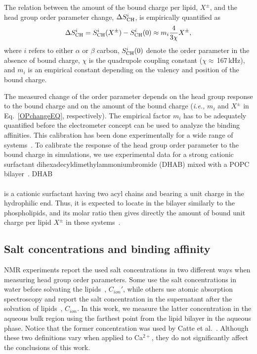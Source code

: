 \documentclass[aip,jcp,twocolumn]{revtex4}
\begin{document}
The relation between the amount of the bound charge per lipid, $X^\pm$, and the head group order parameter change, $\Delta S_{\rm{CH}}^{i}$, is empirically quantified as~\cite{seelig87,ferreira16}
\begin{equation}\label{OPchangeEQ}
\Delta S_{\rm{CH}}^{i}= S_{\rm{CH}}^{i}(X^\pm)-S_{\rm{CH}}^{i}(0) \approx m_i \frac{4 }{3\chi}X^\pm,
\end{equation}
where $i$ refers to either $\alpha$ or $\beta$ carbon, $S_{\rm{CH}}^{i}(0)$ denote the order parameter in the absence of bound charge, $\chi$ is the quadrupole coupling constant ($\chi \approx$\,167\,kHz), and $m_i$ is an empirical constant depending on the valency and position of the bound charge.


The measured change of the order parameter depends on the head group response to the bound charge and on the amount of the bound charge (\textit{i.e.,} $m_i$ and $X^\pm$ in Eq.~\ref{OPchangeEQ}, respectively).  The empirical factor $m_i$ has to be adequately quantified before the electrometer concept can be used to analyze the binding affinities. This calibration has been done experimentally for a wide range of systems~\cite{seelig87, beschiasvili91}. To calibrate the response of the head group order parameter to the bound charge in simulations, we use experimental data for a strong cationic surfactant dihexadecyldimethylammoniumbromide  (DHAB) mixed with a POPC bilayer~\cite{scherer89}. DHAB\\[0.5cm]
\vspace{0.5cm} \\
is a cationic surfactant having two acyl chains and bearing a unit charge in the hydrophilic end. Thus, it is expected to locate in the bilayer similarly to the phospholipids, and its molar ratio then gives directly the amount of bound unit charge per lipid $X^\pm$ in these systems~\cite{scherer89}.

\subsection{Salt concentrations and binding affinity}
NMR experiments report the used salt concentrations in two different ways when measuring head group order parameters.
Some use the salt concentrations in water before solvating the lipids~\cite{akutsu81}, $C_{ion}'$,
while others use atomic absorption spectroscopy and report the salt concentration in
the supernatant after the solvation of lipids~\cite{altenbach84}, $C_{ion}$. In this work,
we measure the latter concentration in the aqueous
bulk region using the farthest point from the lipid bilayer in the aqueous phase.
Notice that the former concentration was used by Catte et al.~\cite{catte16}.
Although these two definitions vary when applied
to Ca$^{2+}$, they do not significantly affect the conclusions of this work.
\end{document}
